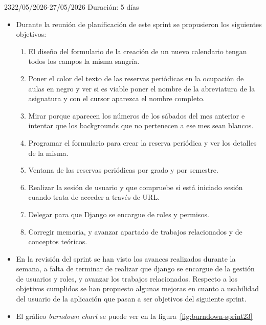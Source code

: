 \begin{Sprint}{23}{22/05/2026-27/05/2026}
	Duración: 5 días
	\begin{itemize}	
		\item{}
		Durante la reunión de planificación de este sprint se propusieron los siguientes objetivos:
		\begin{enumerate}
			\item El diseño del formulario de la creación de un nuevo calendario tengan todos los campos la misma sangría.
			\item Poner el color del texto de las reservas periódicas en la ocupación de aulas en negro y ver si es viable poner el nombre de la abreviatura de la asignatura y con el cursor aparezca el nombre completo.
			\item Mirar porque aparecen los números de los sábados del mes anterior e intentar que los backgrounds que no pertenecen a ese mes sean blancos.
			\item Programar el formulario para crear la reserva periódica y ver los detalles de la misma.
			\item Ventana de las reservas periódicas por grado y por semestre.
			\item Realizar la sesión de usuario y que compruebe si está iniciado sesión cuando trata de acceder a través de URL.
			\item Delegar para que Django se encargue de roles y permisos.
			\item Corregir memoria, y avanzar apartado de trabajos relacionados y de conceptos teóricos.
		\end{enumerate}
		\item{}
		En la revisión del sprint se han visto los avances realizados durante la semana, a falta de terminar de realizar que django se encargue de la gestión de usuarios y roles, y avanzar los trabajos relacionados. Respecto a los objetivos cumplidos se han propuesto algunas mejoras en cuanto a usabilidad del usuario de la aplicación que pasan a ser objetivos del siguiente sprint.
		
		\item{}
		El gráfico \textit{burndown chart} se puede ver en la figura~\ref{fig:burndown-sprint23}
	\end{itemize}
\end{Sprint}


